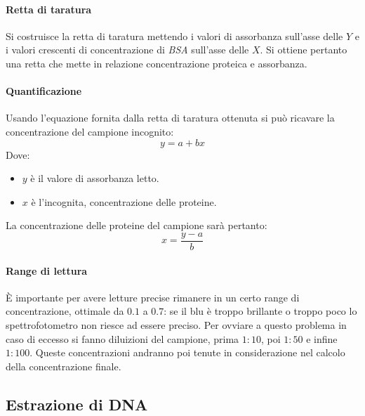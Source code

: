 			\paragraph{Retta di taratura}
			Si costruisce la retta di taratura mettendo i valori di assorbanza sull'asse delle $Y$ e i valori crescenti di concentrazione di \emph{BSA} sull'asse delle $X$. 
			Si ottiene pertanto una retta che mette in relazione concentrazione proteica e assorbanza.

			\paragraph{Quantificazione}
			Usando l'equazione fornita dalla retta di taratura ottenuta si pu\`o ricavare la concentrazione del campione incognito:
			\[y = a + bx\]
			Dove:
			\begin{multicols}{2}
				\begin{itemize}
					\item $y$ \`e il valore di assorbanza letto.
					\item $x$ \`e l'incognita, concentrazione delle proteine.
				\end{itemize}
			\end{multicols}
			La concentrazione delle proteine del campione sar\`a pertanto:
			\[x=\dfrac{y-a}{b}\]

			\paragraph{Range di lettura}
			\`E importante per avere letture precise rimanere in un certo range di concentrazione, ottimale da $0.1$ a $0.7$: se il blu \`e troppo brillante o troppo poco lo spettrofotometro non riesce ad essere preciso.
			Per ovviare a questo problema in caso di eccesso si fanno diluizioni del campione, prima $1:10$, poi $1:50$ e infine $1:100$.
			Queste concentrazioni andranno poi tenute in considerazione nel calcolo della concentrazione finale. 

	\subsection{Estrazione di DNA}

